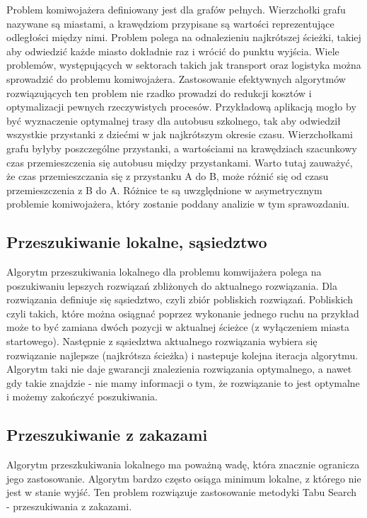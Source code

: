 \documentclass[a4paper,11pt]{article}
\begin{document}
Problem komiwojażera definiowany jest dla grafów pełnych. Wierzchołki grafu nazywane są miastami,
a krawędziom przypisane są wartości reprezentujące odległości między nimi. Problem polega na
odnalezieniu najkrótszej ścieżki, takiej aby odwiedzić każde miasto dokładnie raz i wrócić do punktu
wyjścia. \newline
Wiele problemów, występujących w sektorach takich jak transport oraz logistyka można sprowadzić
do problemu komiwojażera. Zastosowanie efektywnych algorytmów rozwiązujących ten problem nie
rzadko prowadzi do redukcji kosztów i optymalizacji pewnych rzeczywistych procesów. Przykładową
aplikacją mogło by być wyznaczenie optymalnej trasy dla autobusu szkolnego, tak aby odwiedził
wszystkie przystanki z dziećmi w jak najkrótszym okresie czasu. Wierzchołkami grafu byłyby
poszczególne przystanki, a wartościami na krawędziach szacunkowy czas przemieszczenia się autobusu
między przystankami. Warto tutaj zauważyć, że czas przemieszczania się z przystanku A do B, może
różnić się od czasu przemieszczenia z B do A. Różnice te są uwzględnione w asymetrycznym problemie
komiwojażera, który zostanie poddany analizie w tym sprawozdaniu.

\subsection{Przeszukiwanie lokalne, sąsiedztwo}

Algorytm przeszukiwania lokalnego dla problemu komwijażera polega na poszukiwaniu lepszych rozwiązań zbliżonych do aktualnego rozwiązania. Dla rozwiązania definiuje się sąsiedztwo, czyli zbiór pobliskich rozwiązań. Pobliskich czyli takich, które można osiągnać poprzez wykonanie jednego ruchu na przykład może to być zamiana dwóch pozycji w aktualnej ścieżce (z wyłączeniem miasta startowego). Następnie z sąsiedztwa aktualnego rozwiązania wybiera się rozwiązanie najlepsze (najkrótsza ścieżka) i nastepuje kolejna iteracja algorytmu. Algorytm taki nie daje gwarancji znalezienia rozwiązania optymalnego, a nawet gdy takie znajdzie - nie mamy informacji o tym, że rozwiązanie to jest optymalne i możemy zakończyć poszukiwania. 

\subsection{Przeszukiwanie z zakazami}

Algorytm przeszkukiwania lokalnego ma poważną wadę, która znacznie ogranicza jego zastosowanie. Algorytm bardzo często osiąga minimum lokalne, z którego nie jest w stanie wyjść. Ten problem rozwiązuje zastosowanie metodyki Tabu Search - przeszukiwania z zakazami.
\end{document}
